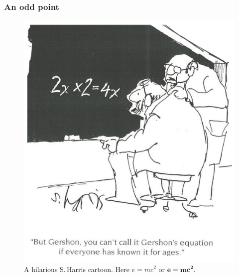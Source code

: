 \documentclass{infommlay}
\begin{document}
\subsubsection*{An odd point}
\lipsum[1]
\begin{figure}[htb]
\centering
\includegraphics[width=0.7\linewidth]{cover_image}
\caption{A hilarious S.\,Harris cartoon. Here $ e = mc^2 $ or $ \bm{e = mc^2}$.}
\label{fig:harris_cartoon}
\end{figure} 
\end{document}
